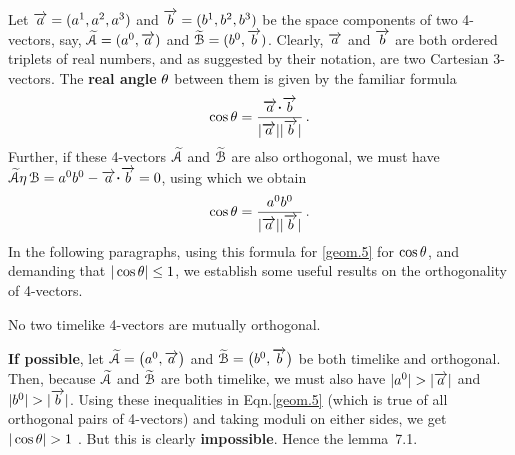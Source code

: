 
Let $\veca{a}=(a^1, a^2,a^3)$ and $\veca{b}= (b^1, 
b^2,b^3)$  be the space components of  two 4-vectors, 
say, $\EuScript{\tilde{A}}=(a^0,\veca{a})$ and 
$\EuScript{\tilde{B}}=(b^0,\veca{b})$. Clearly,  
$\veca{a}$ and  $\veca{b}$ are both ordered triplets of 
real numbers,  and as suggested by their notation, are 
two Cartesian 3-vectors. The \textbf{real angle} $\gkq$ 
between them is given by the familiar formula 
\begin{align*}
\cos\gkq = 
\frac{\veca{a}\dotp\veca{b}}{|\veca{a}||\veca{b}|}\,. 
\end{align*} 
Further, if these 4-vectors $\EuScript{\tilde{A}}$ and 
$\EuScript{\tilde{B}}$ are also orthogonal, we must 
have $\EuScript{\tilde{A}}\gky\,\EuScript{B} = 
a^0b^0-\veca{a}\dotp\veca{b}=0 $, using which we obtain
\begin{align}\label{geom.5} 
\cos\gkq=\frac{a^0b^0}{|\veca{a}||\veca {b}|}\,.
\end{align}
In the following paragraphs, using this formula for
\eqref{geom.5}  for $\cos\gkq$, and demanding that 
$|\cos\gkq|\leq 1$, we establish some useful results on 
the orthogonality of 4-vectors.

\newpage
\Lem No two timelike 4-vectors are mutually orthogonal.

\prf  \textbf{If possible}, let $\EuScript{\tilde{A}}= 
\big(a^0, \veca{a}\big)$ and $\EuScript{\tilde{B}} = 
\big(b^0, \veca{b}\big)$ be both timelike and 
orthogonal. Then, because $\EuScript{\tilde{A}}$ and 
$\EuScript{\tilde{B}}$ are both timelike, we must also 
have $|a^0|>|\veca{a}|$ and $|b^0|>|\veca{b}|$. Using 
these inequalities in  Eqn.\eqref{geom.5} 
(which is true of all orthogonal pairs of 
4-vectors) and taking moduli on either sides, we get 
$|\cos\gkq|>1$ .  But this is clearly 
\textbf{impossible}. Hence the lemma~7.1.


